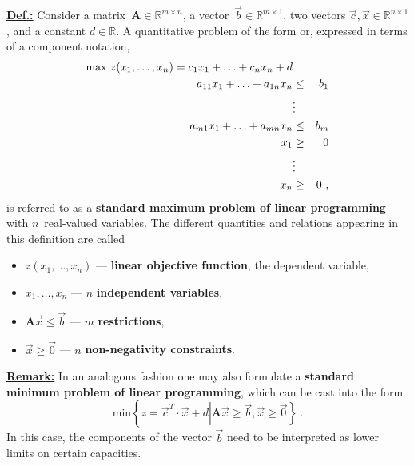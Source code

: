 \medskip
\noindent
\underline{\bf Def.:}
Consider a matrix~$\mathbf{A} \in
\mathbb{R}^{m \times n}$, a vector~$\vec{b} \in
\mathbb{R}^{m \times 1}$, two vectors $\vec{c},\vec{x} \in
\mathbb{R}^{n \times 1}$, and a constant $d \in \mathbb{R}$. A quantitative problem of the form
%
\be
{}
\ee
%
or, expressed in terms of a component notation,
%
\begin{eqnarray}
\lb{lops1}
\text{max}\ z(x_{1},\ldots,x_{n})
= c_{1}x_{1} + \ldots + c_{n}x_{n} + d & & \\
a_{11}x_{1}+\ldots+a_{1n}x_{n} & \leq & b_{1} \\
%
 & \vdots & \nonumber \\
%
a_{m1}x_{1}+\ldots+a_{mn}x_{n} & \leq & b_{m} \\
%
x_{1} & \geq & 0 \\
%
 & \vdots & \nonumber \\
%
\lb{lopsm1}
x_{n} & \geq & 0 \ ,
\end{eqnarray}
%
is referred to as a  {\bf standard maximum problem of 
linear programming} with $n$~real-valued variables. The different 
quantities and relations appearing in this definition are 
called

\begin{itemize}

\item $z(x_{1},\ldots,x_{n})$ --- {\bf linear objective function}, the dependent variable,

\item $x_{1},\ldots,x_{n}$ --- $n$ {\bf independent variables},

\item $\mathbf{A}\vec{x} \leq \vec{b}$ --- $m$ {\bf restrictions},

\item $\vec{x} \geq \vec{0}$ ---
$n$ {\bf non-negativity constraints}.

\end{itemize}

\noindent
\underline{\bf Remark:} In an analogous fashion one may also formulate a {\bf standard minimum problem of linear programming}, which can be cast into the form
%
\[
\text{min}\left\{z=\vec{c}^{T}\cdot\vec{x}
+d\left|\mathbf{A}\vec{x}
\geq \vec{b}, \vec{x} \geq \vec{0}\right.\right\} \ .
\]
%
In this case, the components of the vector $\vec{b}$ need to be 
interpreted as lower limits on certain capacities.

